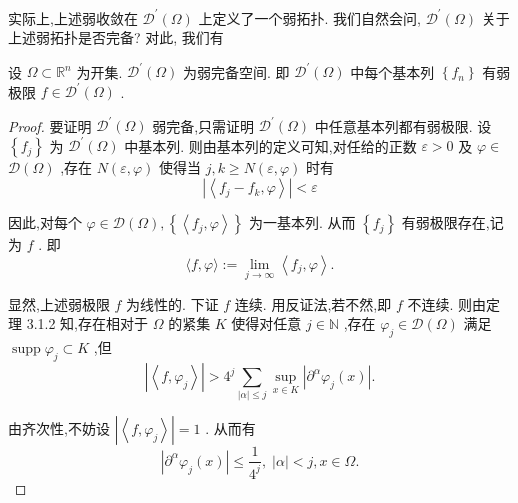 \documentclass[lang=cn,newtx,10pt,scheme=chinese,thmcnt=chapter]{elegantbook}
\begin{document}
实际上,上述弱收敛在 \({\mathcal{D}}^{\prime }\left( \Omega \right)\) 上定义了一个弱拓扑. 我们自然会问, \({\mathcal{D}}^{\prime }\left( \Omega \right)\) 关于上述弱拓扑是否完备? 对此, 我们有
\begin{theorem}
  设 \(\Omega  \subset  {\mathbb{R}}^{n}\) 为开集. \({\mathcal{D}}^{\prime }\left( \Omega \right)\) 为弱完备空间. 即 \({\mathcal{D}}^{\prime }\left( \Omega \right)\) 中每个基本列 \(\left\{  {f}_{n}\right\}\) 有弱极限 \(f \in  {\mathcal{D}}^{\prime }\left( \Omega \right)\) .

\end{theorem}
\begin{proof}
  要证明 \({\mathcal{D}}^{\prime }\left( \Omega \right)\) 弱完备,只需证明 \({\mathcal{D}}^{\prime }\left( \Omega \right)\) 中任意基本列都有弱极限. 设 \(\left\{  {f}_{j}\right\}\) 为 \({\mathcal{D}}^{\prime }\left( \Omega \right)\) 中基本列. 则由基本列的定义可知,对任给的正数 \(\varepsilon  > 0\) 及 \(\varphi  \in\)  \(\mathcal{D}\left( \Omega \right)\) ,存在 \(N\left( {\varepsilon ,\varphi }\right)\) 使得当 \(j,k \geq  N\left( {\varepsilon ,\varphi }\right)\) 时有
\begin{equation*}
\left| \left\langle  {{f}_{j} - {f}_{k},\varphi }\right\rangle  \right|  < \varepsilon
\end{equation*}

因此,对每个 \(\varphi  \in  \mathcal{D}\left( \Omega \right) ,\left\{  \left\langle  {{f}_{j},\varphi }\right\rangle  \right\}\) 为一基本列. 从而 \(\left\{  {f}_{j}\right\}\) 有弱极限存在,记为 \(f\) . 即
\begin{equation*}
\langle f,\varphi \rangle  \mathrel{\text{ := }} \mathop{\lim }\limits_{{j \rightarrow  \infty }}\left\langle  {{f}_{j},\varphi }\right\rangle  .
\end{equation*}

显然,上述弱极限 \(f\) 为线性的. 下证 \(f\) 连续. 用反证法,若不然,即 \(f\) 不连续. 则由定理 3.1.2 知,存在相对于 \(\Omega\) 的紧集 \(K\) 使得对任意 \(j \in  \mathbb{N}\) ,存在 \({\varphi }_{j} \in  \mathcal{D}\left( \Omega \right)\) 满足 \(\operatorname{supp}{\varphi }_{j} \subset  K\) ,但
\begin{equation*}
\left| \left\langle  {f,{\varphi }_{j}}\right\rangle  \right|  > {4}^{j}\mathop{\sum }\limits_{{\left| \alpha \right|  \leqslant  j}}\mathop{\sup }\limits_{{x \in  K}}\left| {{\partial }^{\alpha }{\varphi }_{j}\left( x\right) }\right| .
\end{equation*}

由齐次性,不妨设 \(\left| \left\langle  {f,{\varphi }_{j}}\right\rangle  \right|  = 1\) . 从而有
\begin{equation*}
\left| {{\partial }^{\alpha }{\varphi }_{j}\left( x\right) }\right|  \leqslant  \frac{1}{{4}^{j}},\;\left| \alpha \right|  < j,x \in  \Omega .
\end{equation*}


\end{proof}
\end{document}
